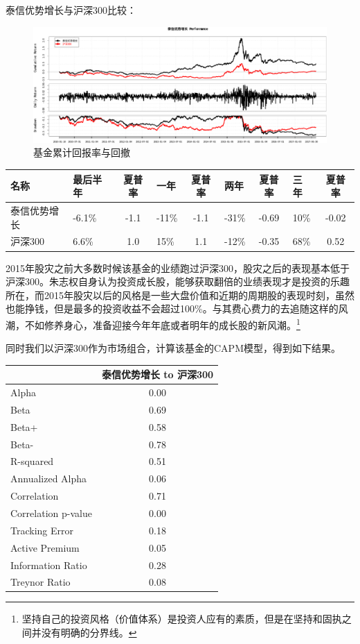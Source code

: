 \documentclass[hyperref,]{ctexart}
\begin{document}
泰信优势增长与沪深300比较：

\begin{figure}[htbp]
\centering
\includegraphics{zzq-detail_files/figure-latex/unnamed-chunk-3-1.pdf}
\caption{基金累计回报率与回撤}
\end{figure}

\begin{longtable}[]{@{}llclclclc@{}}
\toprule
名称 & 最后半年 & 夏普率 & 一年 & 夏普率 & 两年 & 夏普率 & 三年 &
夏普率\tabularnewline
\midrule
\endhead
泰信优势增长 & -6.1\% & -1.1 & -11\% & -1.1 & -31\% & -0.69 & 10\% &
-0.02\tabularnewline
沪深300 & 6.6\% & 1.0 & 15\% & 1.1 & -12\% & -0.35 & 68\% &
0.52\tabularnewline
\bottomrule
\end{longtable}

2015年股灾之前大多数时候该基金的业绩跑过沪深300，股灾之后的表现基本低于沪深300。朱志权自身认为投资成长股，能够获取翻倍的业绩表现才是投资的乐趣所在，而2015年股灾以后的风格是一些大盘价值和近期的周期股的表现时刻，虽然也能挣钱，但是最多的投资收益不会超过100\%。与其费心费力的去追随这样的风潮，不如修养身心，准备迎接今年年底或者明年的成长股的新风潮。\footnote{坚持自己的投资风格（价值体系）是投资人应有的素质，但是在坚持和固执之间并没有明确的分界线。}

同时我们以沪深300作为市场组合，计算该基金的CAPM模型，得到如下结果。

\begin{longtable}[]{@{}lc@{}}
\toprule
& 泰信优势增长 to 沪深300\tabularnewline
\midrule
\endhead
Alpha & 0.00\tabularnewline
Beta & 0.69\tabularnewline
Beta+ & 0.58\tabularnewline
Beta- & 0.78\tabularnewline
R-squared & 0.51\tabularnewline
Annualized Alpha & 0.06\tabularnewline
Correlation & 0.71\tabularnewline
Correlation p-value & 0.00\tabularnewline
Tracking Error & 0.18\tabularnewline
Active Premium & 0.05\tabularnewline
Information Ratio & 0.28\tabularnewline
Treynor Ratio & 0.08\tabularnewline
\bottomrule
\end{longtable}
\end{document}
